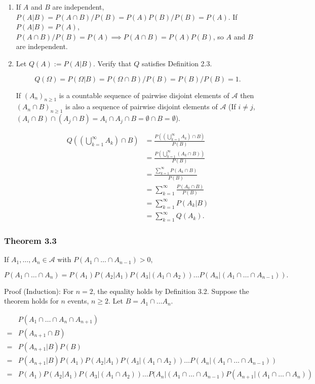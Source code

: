 \documentclass{article}
\begin{document}
\begin{enumerate}
\item If $A$ and $B$ are independent, $P(A \vert B) = P(A\cap B) / P(B) = P(A)P(B) / P(B) = P(A)$. If $P(A \vert B) = P(A)$, $P(A\cap B) / P(B) = P(A) \implies P(A\cap B) = P(A) P(B)$, so $A$ and $B$ are independent. 

\item Let $Q(A) := P(A \vert B)$. Verify that $Q$ satisfies Definition 2.3. 

$$
Q(\Omega) = P(\Omega \vert B) = P(\Omega \cap B) / P(B) = P(B) / P(B) = 1.
$$

If $(A_n)_{n\geq 1}$ is a countable sequence of pairwise disjoint elements of $\mathcal{A}$ then $(A_n \cap B)_{n\geq 1}$ is also a sequence of pairwise disjoint elements of $\mathcal{A}$ (If $i \neq j$, $(A_i \cap B) \cap (A_j \cap B) = A_i \cap A_j \cap B = \emptyset \cap B = \emptyset$). 

\begin{align*}
Q\left(\left(\bigcup_{k=1}^\infty A_k \right) \cap B \right) &= \frac{P\left(\left(\bigcup_{k=1}^\infty A_k \right)\cap B \right)}{P(B)} \\
&= \frac{P\left(\bigcup_{k=1}^\infty (A_k\cap B) \right)}{P(B)} \\
&= \frac{\sum_{k=1}^\infty P(A_k \cap B)}{P(B)} \\
&= \sum_{k=1}^\infty \frac{P(A_k \cap B)}{P(B)} \\
&= \sum_{k=1}^\infty P(A_k \vert B) \\
&= \sum_{k=1}^\infty Q(A_k) .
\end{align*}
\end{enumerate}

\subsubsection*{Theorem 3.3} If $A_1, \dots , A_n \in \mathcal{A}$ with $P(A_1 \cap \dots \cap A_{n-1}) > 0$,

$$P(A_1 \cap \dots \cap A_n) = P(A_1)P(A_2 \vert A_1)P(A_3 \vert (A_1 \cap A_2)) \dots P(A_n \vert (A_1 \cap \dots \cap A_{n-1})).
$$

Proof (Induction): For $n = 2$, the equality holds by Definition 3.2. Suppose the theorem holds for $n$ events, $n \geq 2$. Let $B = A_1 \cap \dots A_n$.

\begin{align*}
&P(A_1 \cap \dots \cap A_n \cap A_{n+1}) \\
= &P(A_{n+1} \cap B) \\
= &P(A_{n+1} \vert B)P(B)\\
= &P(A_{n+1} \vert B)P(A_1)P(A_2 \vert A_1)P(A_3 \vert (A_1 \cap A_2)) \dots P(A_n \vert (A_1 \cap \dots \cap A_{n-1})) \\
= & P(A_1)P(A_2 \vert A_1)P(A_3 \vert (A_1 \cap A_2)) \dots P(A_{n} \vert (A_1 \cap \dots \cap A_{n-1}) P(A_{n+1} \vert (A_1 \cap \dots \cap A_{n})) \\
\end{align*}
\end{document}
